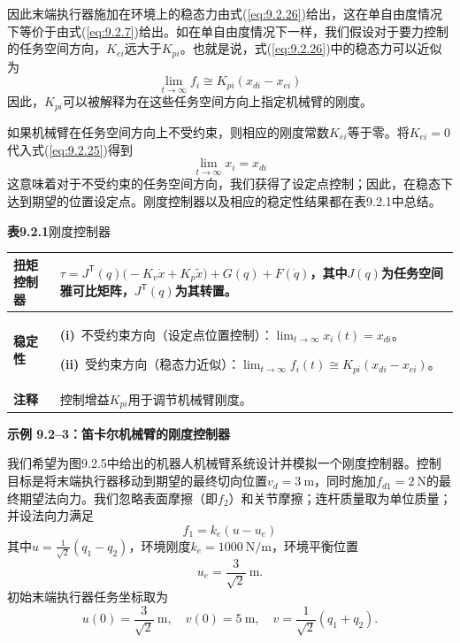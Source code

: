\documentclass[12pt,a4paper]{ctexart}
\begin{document}
因此末端执行器施加在环境上的稳态力由式(\ref{eq:9.2.26})给出，这在单自由度情况下等价于由式(\ref{eq:9.2.7})给出。如在单自由度情况下一样，我们假设对于要力控制的任务空间方向，$K_{ei}$远大于$K_{pi}$。也就是说，式(\ref{eq:9.2.26})中的稳态力可以近似为
\begin{equation}\label{eq:9.2.27}
\lim_{t \to \infty} f_i \cong K_{pi}(x_{di} - x_{ei})
\end{equation}
因此，$K_{pi}$可以被解释为在这些任务空间方向上指定机械臂的刚度。

如果机械臂在任务空间方向上不受约束，则相应的刚度常数$K_{ei}$等于零。将$K_{ei} = 0$代入式(\ref{eq:9.2.25})得到
\begin{equation}\label{eq:9.2.28}
\lim_{t \to \infty} x_i = x_{di}
\end{equation}
这意味着对于不受约束的任务空间方向，我们获得了设定点控制；因此，在稳态下达到期望的位置设定点。刚度控制器以及相应的稳定性结果都在表9.2.1中总结。

\textbf{表9.2.1}\quad 刚度控制器

\begin{center}
\small
\begin{tabular}{|l|p{11cm}|}
\hline
\textbf{扭矩控制器} & $\displaystyle \tau = J^{\mathsf T}(q)\bigl(-K_v \dot{x} + K_p \tilde{x}\bigr) + G(q) + F(\dot{q})$，其中$J(q)$为任务空间雅可比矩阵，$J^{\mathsf T}(q)$为其转置。 \\
\hline
\textbf{稳定性} &
\setlength{\parskip}{6pt}
\textbf{(i)}\ 不受约束方向（设定点位置控制）：$\displaystyle \lim_{t\to\infty} x_i(t) = x_{di}$。\par
\textbf{(ii)}\ 受约束方向（稳态力近似）：$\displaystyle \lim_{t\to\infty} f_i(t) \cong K_{pi}(x_{di} - x_{ei})$。 \\
\hline
\textbf{注释} & 控制增益$K_{pi}$用于调节机械臂刚度。 \\
\hline
\end{tabular}
\end{center}

\textbf{示例 9.2--3：笛卡尔机械臂的刚度控制器}

我们希望为图9.2.5中给出的机器人机械臂系统设计并模拟一个刚度控制器。控制目标是将末端执行器移动到期望的最终切向位置$v_d = 3\ \mathrm{m}$，同时施加$f_{d1} = 2\ \mathrm{N}$的最终期望法向力。我们忽略表面摩擦（即$f_2$）和关节摩擦；连杆质量取为单位质量；并设法向力满足
\begin{equation}\tag{1}
f_1 = k_e(u - u_e)
\end{equation}
其中$u = \frac{1}{\sqrt{2}}(q_1 - q_2)$，环境刚度$k_e = 1000\ \mathrm{N/m}$，环境平衡位置
\begin{equation*}
u_e = \frac{3}{\sqrt{2}}\ \mathrm{m}.
\end{equation*}
初始末端执行器任务坐标取为
\begin{equation}\tag{2}
u(0) = \frac{3}{\sqrt{2}}\ \mathrm{m}, \quad v(0) = 5\ \mathrm{m}, \quad v = \frac{1}{\sqrt{2}}(q_1 + q_2).
\end{equation}
\end{document}

